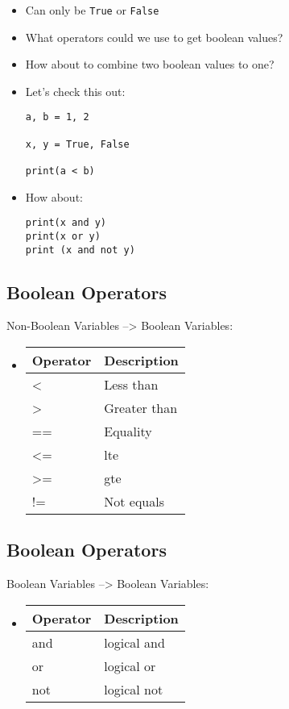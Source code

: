 \documentclass[11pt]{article}
\begin{document}
\begin{itemize}
\item Can only be \texttt{True} or \texttt{False}
\item What operators could we use to get boolean values?
\item How about to combine two boolean values to one?
\item Let's check this out:
\begin{verbatim}
a, b = 1, 2

x, y = True, False

print(a < b)
\end{verbatim}
\item How about:
\begin{verbatim}
print(x and y)
print(x or y)
print (x and not y)
\end{verbatim}
\end{itemize}
\subsection{Boolean Operators}
\label{sec:orgeb9ad22}
Non-Boolean Variables --> Boolean Variables:
\begin{itemize}
\item \begin{center}
\begin{tabular}{ll}
Operator & Description\\
\hline
< & Less than\\
> & Greater than\\
== & Equality\\
<= & lte\\
>= & gte\\
!= & Not equals\\
\end{tabular}
\end{center}
\end{itemize}

\subsection{Boolean Operators}
\label{sec:org3540771}
Boolean Variables --> Boolean Variables:
\begin{itemize}
\item \begin{center}
\begin{tabular}{ll}
Operator & Description\\
\hline
and & logical and\\
or & logical or\\
not & logical not\\
\end{tabular}
\end{center}
\end{itemize}
\end{document}
